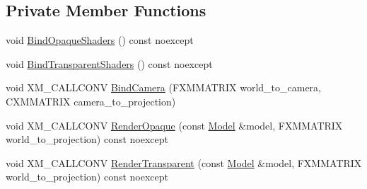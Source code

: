 \subsection*{Private Member Functions}
\begin{DoxyCompactItemize}
\item 
void \hyperlink{classmage_1_1rendering_1_1_depth_pass_aeab0d647dbdc50233cfa4169282682fe}{Bind\+Opaque\+Shaders} () const noexcept
\item 
void \hyperlink{classmage_1_1rendering_1_1_depth_pass_a7c136dce9484e14b4a803f9ec84a10b8}{Bind\+Transparent\+Shaders} () const noexcept
\item 
void X\+M\+\_\+\+C\+A\+L\+L\+C\+O\+NV \hyperlink{classmage_1_1rendering_1_1_depth_pass_a507b99d81d657223bf5bebd5921496fb}{Bind\+Camera} (F\+X\+M\+M\+A\+T\+R\+IX world\+\_\+to\+\_\+camera, C\+X\+M\+M\+A\+T\+R\+IX camera\+\_\+to\+\_\+projection)
\item 
void X\+M\+\_\+\+C\+A\+L\+L\+C\+O\+NV \hyperlink{classmage_1_1rendering_1_1_depth_pass_a2a97b3566a4097d4213cfc8248ae9fd2}{Render\+Opaque} (const \hyperlink{classmage_1_1rendering_1_1_model}{Model} \&model, F\+X\+M\+M\+A\+T\+R\+IX world\+\_\+to\+\_\+projection) const noexcept
\item 
void X\+M\+\_\+\+C\+A\+L\+L\+C\+O\+NV \hyperlink{classmage_1_1rendering_1_1_depth_pass_aa6ead25e27049727933a900d2a82b132}{Render\+Transparent} (const \hyperlink{classmage_1_1rendering_1_1_model}{Model} \&model, F\+X\+M\+M\+A\+T\+R\+IX world\+\_\+to\+\_\+projection) const noexcept
\end{DoxyCompactItemize}

